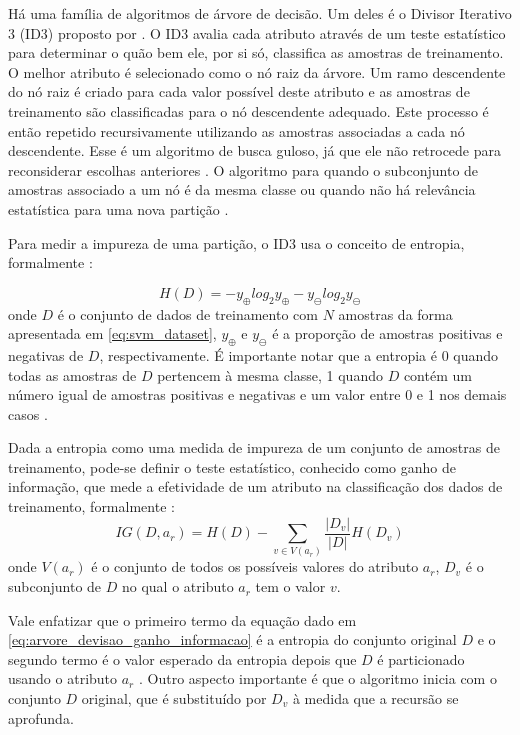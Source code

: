 Há uma família de algoritmos de árvore de decisão. Um deles é o Divisor Iterativo 3 (ID3) proposto por \citet{quinlan:86}. O ID3 avalia cada atributo através de um teste estatístico para determinar o quão bem ele, por si só, classifica as amostras de treinamento. O melhor atributo é selecionado como o nó raiz da árvore. Um ramo descendente do nó raiz é criado para cada valor possível deste atributo e as amostras de treinamento são classificadas para o nó descendente adequado. Este processo é então repetido recursivamente utilizando as amostras associadas a cada nó descendente. Esse é um algoritmo de busca guloso, já que ele não retrocede para reconsiderar escolhas anteriores \citep{mitchell:97}. O algoritmo para quando o subconjunto de amostras associado a um nó é da mesma classe ou quando não há relevância estatística para uma nova partição \citep{quinlan:86}.

Para medir a impureza de uma partição, o ID3 usa o conceito de entropia, formalmente \citep{quinlan:86}:

\begin{equation}
\label{eq:arvore_devisao_entropia}
H(D) = - y_\oplus log_2 y_\oplus - y_\ominus log_2 y_\ominus
\end{equation}
\noindent onde $D$ é o conjunto de dados de treinamento com $N$ amostras da forma apresentada em \ref{eq:svm_dataset}, $y_\oplus$ e $y_\ominus$ é a proporção de amostras positivas e negativas de $D$, respectivamente. É importante notar que a entropia é 0 quando todas as amostras de $D$ pertencem à mesma classe, 1 quando $D$ contém um número igual de amostras positivas e negativas e um valor entre 0 e 1 nos demais casos \citep{mitchell:97}.

Dada a entropia como uma medida de impureza de um conjunto de amostras de treinamento, pode-se definir o teste estatístico, conhecido como ganho de informação, que mede a efetividade de um atributo na classificação dos dados de treinamento, formalmente \citep{quinlan:86}:
\begin{equation}
\label{eq:arvore_devisao_ganho_informacao}
IG(D, a_r) = H(D) - \sum_{v \in V(a_r)} \frac{|D_v|}{|D|} H(D_v)
\end{equation}
\noindent onde $V(a_r)$ é o conjunto de todos os possíveis valores do atributo $a_r$, $D_v$ é o subconjunto de $D$ no qual o atributo $a_r$ tem o valor $v$.

Vale enfatizar que o primeiro termo da equação dado em \ref{eq:arvore_devisao_ganho_informacao} é a entropia do conjunto original $D$ e o segundo termo é o valor esperado da entropia depois que $D$ é particionado usando o atributo $a_r$ \citep{mitchell:97}. Outro aspecto importante é que o algoritmo inicia com o conjunto $D$ original, que é substituído por $D_v$ à medida que a recursão se aprofunda.

